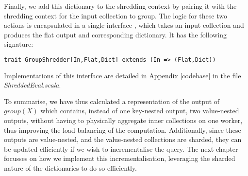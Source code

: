 Finally, we add this dictionary to the shredding context by pairing it with the shredding context for the input collection to group. The logic for these two actions is encapsulated in a single interface , which takes an input collection and produces the flat output and corresponding dictionary. It has the following signature:
\begin{lstlisting}
trait GroupShredder[In,Flat,Dict] extends (In => (Flat,Dict))
\end{lstlisting}
Implementations of this interface are detailed in Appendix \ref{codebase} in the file \textit{ShreddedEval.scala}.

To summarise, we have thus calculated a representation of the output of $group(X)$ which contains, instead of one key-nested output, two value-nested outputs, without having to physically aggregate inner collections on one worker, thus improving the load-balancing of the computation. Additionally, since these outputs are value-nested, and the value-nested collections are sharded, they can be updated efficiently if we wish to incrementalise the query. The next chapter focusses on how we implement this incrementalisation, leveraging the sharded nature of the dictionaries to do so efficiently.